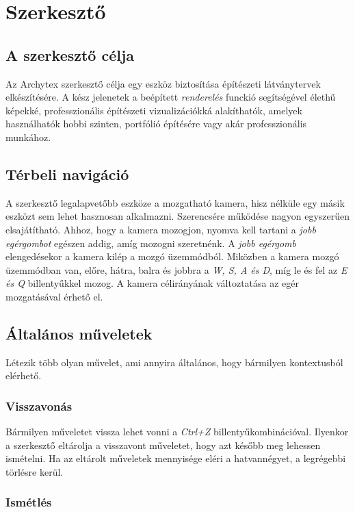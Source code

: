 \section{Szerkesztő}

\subsection{A szerkesztő célja}

Az Archytex szerkesztő célja egy eszköz biztosítása építészeti látványtervek elkészítésére. A kész
jelenetek a beépített \emph{renderelés} funckió segítségével élethű képekké, professzionális
építészeti vizualizációkká alakíthatók, amelyek használhatók hobbi szinten, portfólió építésére vagy
akár professzionális munkához.

\subsection{Térbeli navigáció}

A szerkesztő legalapvetőbb eszköze a mozgatható kamera, hisz nélküle egy másik eszközt sem lehet
hasznosan alkalmazni. Szerencsére működése nagyon egyszerűen elsajátítható. Ahhoz, hogy a kamera
mozogjon, nyomva kell tartani a \emph{jobb egérgombot} egészen addig, amíg mozogni szeretnénk.
A \emph{jobb egérgomb} elengedésekor a kamera kilép a mozgó üzemmódból. Miközben a kamera mozgó
üzemmódban van, előre, hátra, balra és jobbra a \emph{W, S, A és D}, míg le és
fel az \emph{E és Q} billentyűkkel mozog. A kamera célirányának változtatása az egér mozgatásával
érhető el.

\subsection{Általános műveletek}

Létezik több olyan művelet, ami annyira általános, hogy bármilyen kontextusból elérhető.

\subsubsection{Visszavonás}

Bármilyen műveletet vissza lehet vonni a \emph{Ctrl+Z} billentyűkombinációval. Ilyenkor a
szerkesztő eltárolja a visszavont műveletet, hogy azt később meg lehessen ismételni. Ha az eltárolt
műveletek mennyisége eléri a hatvannégyet, a legrégebbi törlésre kerül.

\subsubsection{Ismétlés}

